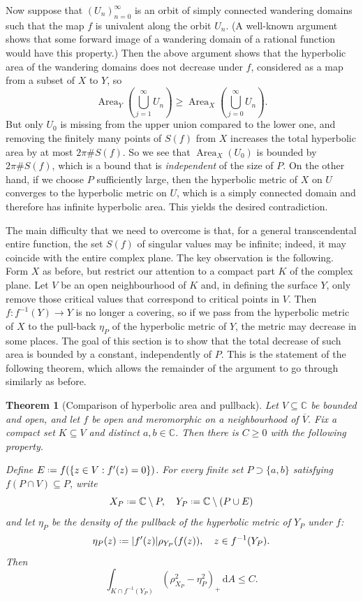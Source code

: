\documentclass[12pt,a4paper,reqno]{amsart}
\newcommand{\Area}{\operatorname{Area}}
\theoremstyle{plain}
\newtheorem{thm}{Theorem}[section]
\newcommand{\dA}{\mathrm dA}
\renewcommand{\subset}{\subseteq}
\theoremstyle{definition}
\theoremstyle{remark}
\numberwithin{equation}{section}
\newcommand \C{\mathbb{C}}
\newcommand*{\defeq}{\mathrel{\vcenter{\baselineskip0.5ex \lineskiplimit0pt
                     \hbox{\scriptsize.}\hbox{\scriptsize.}}}%
                     =}
\begin{document}
Now suppose that $(U_n)_{n=0}^{\infty}$ is an orbit of simply connected wandering domains
 such that the map $f$ is univalent along the orbit $U_n$. (A well-known argument shows that
 some forward image of a wandering domain of a rational function would have this property.) 
 Then the above argument shows that the hyperbolic area of the 
 wandering domains does not decrease under $f$, considered as a map from a subset of $X$ to
 $Y$, so 
   \[ \Area_{Y}\left(\bigcup_{j=1}^{\infty} U_n\right) \geq 
      \Area_{X} \left(\bigcup_{j=0}^{\infty} U_n\right). \]
 But only $U_0$ is missing from the upper union compared to the lower one, 
  and removing the finitely many points of $S(f)$ from $X$ increases the total
  hyperbolic area by at most $2\pi \# S(f)$. So we see that $\Area_X(U_0)$ is bounded by
  $2\pi \# S(f)$, which is a bound that is \emph{independent} of the size of $P$. On the other hand,
  if we choose $P$ sufficiently large, then the hyperbolic metric of $X$ on $U$ converges
  to the hyperbolic metric on $U$, which is a simply connected domain and therefore has infinite
  hyperbolic area. This yields the desired contradiction.

 The main difficulty that we need to overcome is that,
  for a general transcendental entire function,
  the set $S(f)$ of singular values 
  may be infinite; indeed, it may coincide with the entire complex plane. The key observation is
  the following. Form $X$ as before, but restrict our
  attention to a compact part $K$ of the complex plane. 
  Let $V$ be an open neighbourhood of $K$ and,
  in defining the surface $Y$, only remove those critical values that correspond to critical points in $V$. 
  Then $f\colon f^{-1}(Y)\to Y$
  is no longer a covering, so if
  we pass from the hyperbolic metric of $X$ to   the pull-back $\eta_P$ of the hyperbolic metric of $Y$,
  the metric may decrease in some places. The goal of this
  section is to show that the total decrease of such area is bounded by
  a constant, independently of $P$. 
  This is the statement of the following theorem, 
  which allows the remainder of the
  argument to go through similarly as before. 

\begin{thm}[Comparison of hyperbolic area and pullback]      \label{thm:localdeficit}
Let $V\subset\C$ be bounded and open, and let $f$ be open and meromorphic  on
a neighbourhood of $\overline V$. Fix a compact set
$K\subset V$ and distinct $a,b\in\C$. Then there is $C\geq 0$ with the following property. 

Define 
$E\defeq f(\{z\in V:f'(z)=0\})$.
For every finite set $P\supset\{a,b\}$ satisfying
$f(P\cap V)\subset P$, write
\[
 X_P\defeq \C\setminus P,\quad Y_P\defeq \C\setminus(P\cup E) \]
 and let $\eta_P$ be the density of the pullback of the hyperbolic metric of $Y_P$ 
 under $f$: 
 \[
 \eta_P(z)\defeq \lvert f'(z)\rvert \rho_{Y_P}(f(z)), \quad z \in f^{-1}(Y_P).
\]
Then 
\[
 \int_{K\cap f^{-1}(Y_P)}
       (\rho_{X_P}^2-\eta_P^2)_+\,\dA\le C.
\]
\end{thm}  
\end{document}
